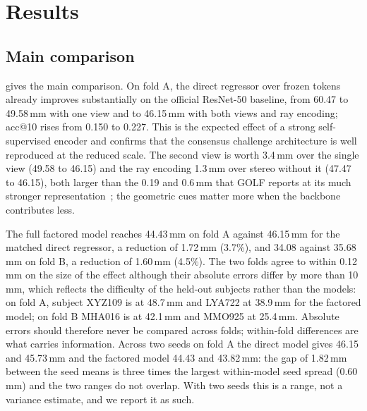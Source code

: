 \section{Results}
\label{sec:results}

\subsection{Main comparison}
\label{sec:main}

\begin{table}[t]
\centering\small
\caption{Held-out-subject results on SHOW3D. Fold A holds out XYZ109 and LYA722 (the organisers' development split), fold B holds out MHA016 and MMO925. ADE in mm (lower is better); accuracies are fractions of joints within the threshold; SD is the surface distance of predicted endpoints to the ground-truth posed object (mm). Where two numbers are given they are seeds 0 and 1. All token models share the frozen DINOv3 ViT-B/16 cache, decoder, optimiser and schedule; the InterField row is the organisers' published result on the identical fold-A split. Recall is 1.0 for every model.}
\label{tab:main}

\end{table}

 gives the main comparison. On fold A, the direct regressor over frozen tokens already improves substantially on the official ResNet-50 baseline, from 60.47 to 49.58\,mm with one view and to 46.15\,mm with both views and ray encoding; acc@10 rises from 0.150 to 0.227. This is the expected effect of a strong self-supervised encoder and confirms that the consensus challenge architecture is well reproduced at the reduced scale. The second view is worth 3.4\,mm over the single view (49.58 to 46.15) and the ray encoding 1.3\,mm over stereo without it (47.47 to 46.15), both larger than the 0.19 and 0.6\,mm that GOLF reports at its much stronger representation~\cite{zou2026golf}; the geometric cues matter more when the backbone contributes less.

The full factored model reaches 44.43\,mm on fold A against 46.15\,mm for the matched direct regressor, a reduction of 1.72\,mm (3.7\%), and 34.08 against 35.68\,mm on fold B, a reduction of 1.60\,mm (4.5\%). The two folds agree to within 0.12\,mm on the size of the effect although their absolute errors differ by more than 10\,mm, which reflects the difficulty of the held-out subjects rather than the models: on fold A, subject XYZ109 is at 48.7\,mm and LYA722 at 38.9\,mm for the factored model; on fold B MHA016 is at 42.1\,mm and MMO925 at 25.4\,mm. Absolute errors should therefore never be compared across folds; within-fold differences are what carries information. Across two seeds on fold A the direct model gives 46.15 and 45.73\,mm and the factored model 44.43 and 43.82\,mm: the gap of 1.82\,mm between the seed means is three times the largest within-model seed spread (0.60\,mm) and the two ranges do not overlap. With two seeds this is a range, not a variance estimate, and we report it as such.

